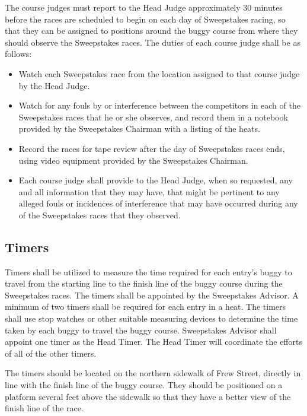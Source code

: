 	The course judges must report to the Head Judge approximately 30 minutes before
	the races are scheduled to begin on each day of Sweepstakes racing, so that
	they can be assigned to positions around the buggy course from where they
	should observe the Sweepstakes races. The duties of each course
	judge shall be as follows:

	\begin{itemize}
		
		\item Watch each Sweepstakes race from the location
		assigned to that course judge by the Head Judge.

		\item Watch for any fouls by or interference between the competitors in 
		each of the Sweepstakes races that he or she observes, and record them in 
		a notebook provided by the Sweepstakes Chairman with a listing of the heats. 

		\item Record the races for tape review after the day of Sweepstakes races ends,
		using video equipment provided by the Sweepstakes Chairman.

		\item Each course judge shall provide to the Head Judge, when so requested,
		any and all information that they may have, that might be pertinent to any
		alleged fouls or incidences of interference that may have occurred during any
		of the Sweepstakes races that they observed.

	\end{itemize}

\subsection{Timers}

	Timers shall be utilized to measure the time required for each entry's buggy to
	travel from the starting line to the finish line of the buggy course during the
	Sweepstakes races. The timers shall be appointed by the Sweepstakes Advisor. A
	minimum of two timers shall be required for each entry in a heat. The timers
	shall use stop watches or other suitable measuring devices to determine the
	time taken by each buggy to travel the buggy course. Sweepstakes Advisor shall
	appoint one timer as the Head Timer. The Head Timer will coordinate the efforts
	of all of the other timers.

	The timers should be located on the northern sidewalk of Frew Street, directly
	in line with the finish line of the buggy course. They should be positioned on
	a platform several feet above the sidewalk so that they have a better view of
	the finish line of the race.

